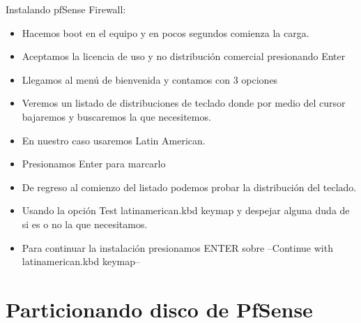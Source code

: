 \documentclass[12pt,letterspaper]{report}
\begin{document}
Instalando pfSense Firewall: \par
\begin{itemize}

\item Hacemos boot en el equipo y en pocos segundos comienza la carga.

\item Aceptamos la licencia de uso y no distribución comercial presionando Enter

\item Llegamos al menú de bienvenida y contamos con 3 opciones
\end {itemize}

\begin {itemize}
\begin {enumerate}

\item Install: Comenzar los pasos de instalación (la que usaremos en este articulo)
\item Rescue Shell: Caer en el prompt del OS FreeBSD y realizar por comandos tareas de rescate o administración de nuestro cortafuegos
\item Recover config.xml: Restaurar un config.xml en un pfSense dañado o con problemas. Una forma útil de recuperarnos de un desastre
\end {enumerate}

Presionamos Enter sobre Install

\item Veremos un listado de distribuciones de teclado donde por medio del cursor bajaremos y buscaremos la que necesitemos.

\item En nuestro caso usaremos Latin American.

\item Presionamos Enter para marcarlo

\item De regreso al comienzo del listado podemos probar la distribución del teclado.

\item Usando la opción Test latinamerican.kbd keymap y despejar alguna duda de si es o no la que necesitamos.

\item Para continuar la instalación presionamos ENTER sobre --Continue with latinamerican.kbd keymap-- 
\end{itemize}


\part{Particionando disco de PfSense}
\end{document}
